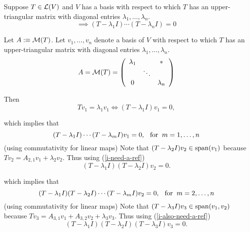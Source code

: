 \begin{thm}
  \label{thm:equation-satisfied-by-operator-with-upper-triangular-matrix}
  Suppose $T\in \mathcal{L}(V)$ and $V$ has a basis with respect to which $T$ has an upper-triangular matrix with diagonal entries $\lambda_1, \dots, \lambda_n$.
  \begin{equation}
    \implies (T-\lambda_1I) \cdots (T-\lambda_nI)=0
  \end{equation}
\end{thm}
\begin{prf}
  Let $A :\equiv \mathcal{M}(T)$. Let $v_1, \ldots, v_n$ denote a basis of $V$ with respect to which $T$ has an upper-triangular matrix with diagonal entries $\lambda_1, \ldots, \lambda_n$.
  \begin{equation}
    A=\mathcal{M}(T) =
    \left( {\begin{array}{ccc}
        \lambda_1 &         &  * \\
                  &  \ddots &    \\
            0     &         & \lambda_n
    \end{array} } \right)
  \end{equation}
  
  Then
  \begin{equation}
    \label{i-need-a-ref}
    T v_1 = \lambda_1 v_1 \iff (T-\lambda_1 I)  v_1 = 0,
  \end{equation}

  which implies that
  \begin{equation}
    (T-\lambda_1 I) \cdots (T-\lambda_m I) v_1 = 0, \;\;\, \text{for}\;\; m = 1, \ldots, n
  \end{equation}
  (using commutativity for linear maps)
  \bigbreak
  Note that $(T-\lambda_2 I) v_2 \in \operatorname{span} (v_1)$ because $T v_2 = A_{2,1} v_1 + \lambda_2 v_2$. Thus using (\ref{i-need-a-ref})
  \begin{equation}
    \label{i-also-need-a-ref}
    (T- \lambda_1 I) (T- \lambda_2 I) v_2 = 0.
  \end{equation}
  
  which implies that
  \begin{equation}
    (T-\lambda_1 I) (T-\lambda_2 I) \cdots (T-\lambda_m I) v_2 = 0, \;\;\, \text{for}\;\; m = 2, \ldots, n
  \end{equation}
  (using commutativity for linear maps)
  \bigbreak
  Note that $(T-\lambda_3 I) v_3 \in \operatorname{span} (v_1, v_2)$ because $T v_3 = A_{3,1} v_1 +   A_{3,2} v_2 + \lambda_3 v_3$. 
  Thus using (\ref{i-also-need-a-ref})
  \begin{equation}
    (T- \lambda_1 I) (T- \lambda_2 I) (T- \lambda_3 I)v_3 = 0.
  \end{equation}
  

\end{prf}
